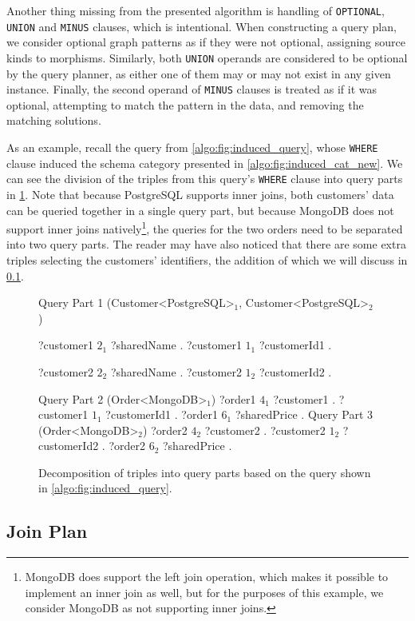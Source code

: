 Another thing missing from the presented algorithm is handling of \texttt{OPTIONAL}, \texttt{UNION} and \texttt{MINUS} clauses, which is intentional.
When constructing a query plan, we consider optional graph patterns as if they were not optional, assigning source kinds to morphisms.
Similarly, both \texttt{UNION} operands are considered to be optional by the query planner, as either one of them may or may not exist in any given instance.
Finally, the second operand of \texttt{MINUS} clauses is treated as if it was optional, attempting to match the pattern in the data, and removing the matching solutions.

As an example, recall the query from \cref{algo:fig:induced_query}, whose \texttt{WHERE} clause induced the schema category presented in \cref{algo:fig:induced_cat_new}.
We can see the division of the triples from this query's \texttt{WHERE} clause into query parts in \cref{algo:fig:induced_parts}.
Note that because PostgreSQL supports inner joins, both customers' data can be queried together in a single query part, but because MongoDB does not support inner joins natively\footnote{MongoDB does support the left join operation, which makes it possible to implement an inner join as well, but for the purposes of this example, we consider MongoDB as not supporting inner joins.}, the queries for the two orders need to be separated into two query parts.
The reader may have also noticed that there are some extra triples selecting the customers' identifiers, the addition of which we will discuss in \cref{algo:subsection:joinplan}.

\begin{figure}[ht]
\begin{code}[codes={\catcode`$=3\catcode`_=8}]
Query Part 1 (Customer<PostgreSQL>$_1$, Customer<PostgreSQL>$_2$) {
    ?customer1 $2_1$ ?sharedName .
    ?customer1 $1_1$ ?customerId1 .

    ?customer2 $2_2$ ?sharedName .
    ?customer2 $1_2$ ?customerId2 .
}
Query Part 2 (Order<MongoDB>$_1$) {
    ?order1 $4_1$ ?customer1 .
    ?customer1 $1_1$ ?customerId1 .
    ?order1 $6_1$ ?sharedPrice .
}
Query Part 3 (Order<MongoDB>$_2$) {
    ?order2 $4_2$ ?customer2 .
    ?customer2 $1_2$ ?customerId2 .
    ?order2 $6_2$ ?sharedPrice .
}
\end{code}
\caption{Decomposition of triples into query parts based on the query shown in \cref{algo:fig:induced_query}.}\label{algo:fig:induced_parts}
\end{figure}

\subsection{Join Plan}
\label{algo:subsection:joinplan}

